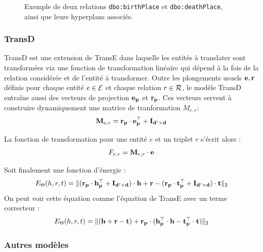 \begin{figure}[hbt]
    \centering
    
    \caption[Exemple des possibilités laissées par TransH]{Exemple de deux relations \texttt{dbo:birthPlace} et \texttt{dbo:deathPlace}, ainsi que leurs hyperplans associés.}
    \label{fig:transh-dual}
\end{figure}

\subsubsection{TransD}

TransD est une extension de TransE dans laquelle les entités à translater sont transformées via une fonction de transformation linéaire qui dépend à la fois de la relation considérée et de l'entité à transformer. Outre les plongements usuels $\bf{e}, \bf{r}$ définis pour chaque entité $e \in \Ent $ et chaque relation $r \in \Rel$, le modèle TransD entraîne aussi des vecteurs de projection $\bf{e_p}$ et $\bf{r_p}$. Ces vecteurs servent à construire dynamiquement une matrice de tranformation $M_{e, r}$:
\begin{equation}
    \label{eq:kge-transd-matrix}
    \bf{M}_{e, r} = \bf{r_p \cdot e_p^\top + I_{d' \times d}}
\end{equation}

La fonction de transformation pour une entité $e$ et un triplet $r$ s'écrit alors :
\begin{equation}
    \label{eq:kge-transd-function}
    F_{e, r} = \bf{M}_{e, r} \cdot \bf{e}
\end{equation}

Soit finalement une fonction d'énergie :
\begin{equation}
    E_\Theta(h, r, t) = \| (\bf{r_p \cdot h_p^\top + I_{d' \times d}}) \cdot \bf{h} + \mathbf{r} - (\bf{r_p \cdot t_p^\top + I_{d' \times d}}) \cdot \bf{t} \|_2 
\end{equation}
On peut voir cette équation comme l'équation de TransE avec un terme correcteur :
\begin{equation}
    E_\Theta(h, r, t) = \| (\bf{h + r - t}) + \bf{r_p} \cdot (\bf{ h_p^\top \cdot h - t_p^\top \cdot t}) \|_2 
\end{equation}


\subsubsection{Autres modèles}

